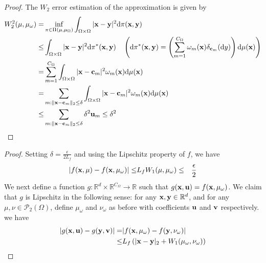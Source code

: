 \documentclass[aspectratio=169]{beamer}
\begin{document}
\begin{frame}
\begin{proof}
    The $W_2$ error estimation of the approximation is given by 
    \[
    \begin{aligned}
    W^2_2(\mu,\mu_\omega ) =& \inf_{\pi\in \Pi(\mu,\mu_\Omega)}\int_{\Omega\times\Omega} |\mathbf{x}-\mathbf{y}|^2 \mathrm{d} \pi(\mathbf{x},\mathbf{y})\\
        \leq & \int_{\Omega\times\Omega} |\mathbf{x}-\mathbf{y}|^2 \mathrm{d} \pi^*(\mathbf{x},\mathbf{y}) \quad \left( \mathrm{d} \pi^*(\mathbf{x},\mathbf{y}) = \left(\sum_{m=1}^{C_\Omega}\omega_m(\mathbf{x})\delta_{\mathbf{c}_m}(\mathrm{d} y )\right)\mathrm{d} \mu(\mathbf{x})  \right)\\
        = & \sum_{m=1}^{C_\Omega}\int_{\Omega\times\Omega} |\mathbf{x}-\mathbf{c}_m|^2 \omega_m(\mathbf{x})\mathrm{d} \mu(\mathbf{x})\\
        = & \sum_{m:\|\mathbf{x}-\mathbf{c}_m\|_2\leq \delta}\int_{\Omega\times\Omega} |\mathbf{x}-\mathbf{c}_m|^2 \omega_m(\mathbf{x})\mathrm{d} \mu(\mathbf{x})\\
        \leq & \sum_{m:\|\mathbf{x}-\mathbf{c}_m\|_2\leq \delta} \delta ^2 \mathbf{u}_m  \leq \delta ^2
    \end{aligned}
    \]
    \end{proof}
\end{frame}
\begin{frame}
\begin{proof}
    Setting $\delta = \frac{\epsilon}{2L_f}$ and using the Lipschitz property of $f$, we have 
    \[
    \begin{aligned}
    |f(\mathbf{x} , \mu)- f(\mathbf{x},\mu_\omega) |\leq & L_f  W_1(\mu,\mu_\omega)
    \leq& \frac{\epsilon}{2}
    \end{aligned}
    \]
    We next define a function $g:\mathbb R^d\times \mathbb R^{C_\Omega}\to \mathbb R$ such that $g(\mathbf{x},\mathbf{u}) = f(\mathbf{x},\mu_\omega)$. We claim that $g$ is Lipschitz in the following sense: for any $\mathbf{x},\mathbf{y}\in \mathbb R^d$, and for any $\mu,\nu\in \mathcal P_2(\Omega)$, define $\mu_\omega$ and $\nu_\omega$ as before with coefficients $\mathbf{u}$ and $\mathbf{v}$ respectively. we have
    \[
    \begin{aligned}
        |g(\mathbf{x},\mathbf{u})-g(\mathbf{y},\mathbf{v})| =&  |f(\mathbf{x},\mu_\omega)-f(\mathbf{y},\nu_\omega)|\\
        \leq & L_f\left(|\mathbf{x}-\mathbf{y}|_2 + W_1(\mu_\omega,\nu_\omega )  \right)
     \end{aligned}
    \]
    \end{proof}
\end{frame}
\end{document}
